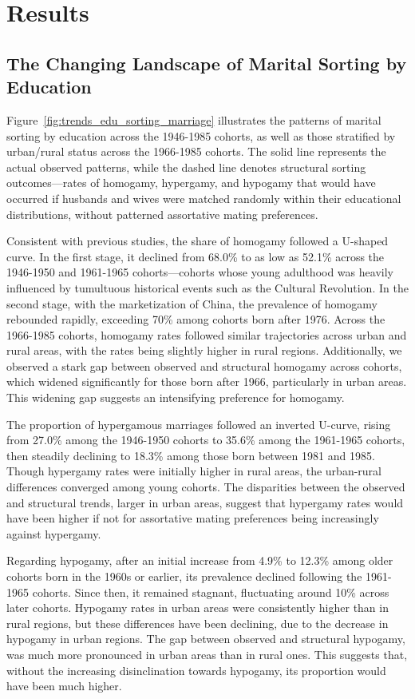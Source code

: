 \section{Results}
\label{sec:ch4-results}

\subsection{The Changing Landscape of Marital Sorting by Education}

Figure~\ref{fig:trends_edu_sorting_marriage} illustrates the patterns of marital sorting by education across the 1946-1985 cohorts, as well as those stratified by urban/rural status across the 1966-1985 cohorts. The solid line represents the actual observed patterns, while the dashed line denotes structural sorting outcomes—rates of homogamy, hypergamy, and hypogamy that would have occurred if husbands and wives were matched randomly within their educational distributions, without patterned assortative mating preferences.

Consistent with previous studies, the share of homogamy followed a U-shaped curve. In the first stage, it declined from 68.0\% to as low as 52.1\% across the 1946-1950 and 1961-1965 cohorts—cohorts whose young adulthood was heavily influenced by tumultuous historical events such as the Cultural Revolution. In the second stage, with the marketization of China, the prevalence of homogamy rebounded rapidly, exceeding 70\% among cohorts born after 1976. Across the 1966-1985 cohorts, homogamy rates followed similar trajectories across urban and rural areas, with the rates being slightly higher in rural regions. Additionally, we observed a stark gap between observed and structural homogamy across cohorts, which widened significantly for those born after 1966, particularly in urban areas. This widening gap suggests an intensifying preference for homogamy.

The proportion of hypergamous marriages followed an inverted U-curve, rising from 27.0\% among the 1946-1950 cohorts to 35.6\% among the 1961-1965 cohorts, then steadily declining to 18.3\% among those born between 1981 and 1985. Though hypergamy rates were initially higher in rural areas, the urban-rural differences converged among young cohorts. The disparities between the observed and structural trends, larger in urban areas, suggest that hypergamy rates would have been higher if not for assortative mating preferences being increasingly against hypergamy.

Regarding hypogamy, after an initial increase from 4.9\% to 12.3\% among older cohorts born in the 1960s or earlier, its prevalence declined following the 1961-1965 cohorts. Since then, it remained stagnant, fluctuating around 10\% across later cohorts. Hypogamy rates in urban areas were consistently higher than in rural regions, but these differences have been declining, due to the decrease in hypogamy in urban regions. The gap between observed and structural hypogamy, was much more pronounced in urban areas than in rural ones. This suggests that, without the increasing disinclination towards hypogamy, its proportion would have been much higher.

